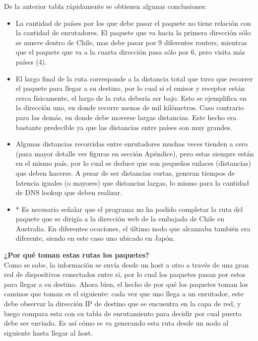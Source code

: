 \documentclass[letterpaper,10pt,onecolumn,titlepage]{article}
\begin{document}
De la anterior tabla rápidamente se obtienen algunas conclusiones:

\begin{itemize}

 \item La cantidad de países por los que debe pasar el paquete no tiene relación con la cantidad de enrutadores. El paquete que va hacia la primera dirección sólo se mueve dentro de Chile, mas debe pasar por 9 diferentes routers, mientras que el paquete que va a la cuarta dirección pasa sólo por 6, pero visita más países (4).

 \item El largo final de la ruta corresponde a la distancia total que tuvo que recorrer el paquete para llegar a su destino, por lo cual si el emisor y receptor están cerca físicamente, el largo de la ruta debería ser bajo. Esto se ejemplifica en la dirección uno, en donde recorre menos de mil kilómetros. Caso contrario para las demás, en donde debe moverse largas distancias. Este hecho era bastante predecible ya que las distancias entre países son muy grandes.
 
 \item Algunas distancias recorridas entre enrutadores muchas veces tienden a cero (para mayor detalle ver figuras en sección Apéndice), pero estas siempre están en el mismo país, por lo cual se deduce que son pequeños enlaces (distancias) que deben hacerse. A pesar de ser distancias cortas, generan tiempos de latencia iguales (o mayores) que distancias largas, lo mismo para la cantidad de DNS lookup que deben realizar.
 
 \item * Es necesario señalar que el programa no ha podido completar la ruta del paquete que se dirigía a la dirección web de la embajada de Chile en Australia. En diferentes ocaciones, el último nodo que alcanzaba también era diferente, siendo en este caso uno ubicado en Japón.
 
\end{itemize}

\noindent \textbf{¿Por qué toman estas rutas los paquetes?} \\

Como se sabe, la información se envía desde un host a otro a través de una gran red de dispositivos conectados entre si, por lo cual los paquetes pasan por estos para llegar a su destino. Ahora bien, el hecho de por qué los paquetes toman los caminos que toman es el siguiente: cada vez que uno llega a un enrutador, este debe observar la dirección IP de destino que se encuentra en la capa de red, y luego compara esta con su tabla de enrutamiento para decidir por cual puerto debe ser enviado. Es así cómo se va generando esta ruta desde un nodo al siguiente hasta llegar al host. \\
\end{document}
